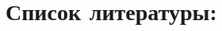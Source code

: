 \documentclass[a4paper]{article}
\begin{document}


\clearpage\section[Список
литературы:]{Список
литературы:}


\end{document}
